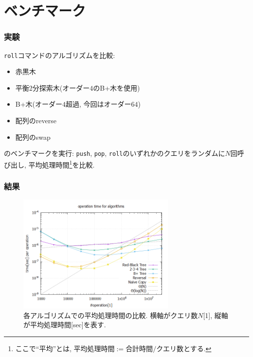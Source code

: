 \documentclass[10pt]{beamer}
\begin{document}
\section{ベンチマーク}
\begin{frame}
    \frametitle{実験}

    \texttt{roll}コマンドのアルゴリズムを比較:
    \begin{itemize}
        \item 赤黒木
        \item 平衡2分探索木(オーダー$4$のB+木を使用)
        \item B+木(オーダー$4$超過, 今回はオーダー$64$)
        \item 配列のreverse
        \item 配列のswap
    \end{itemize}

    \cite{primenumber:2022}のベンチマークを実行:
    \texttt{push}, \texttt{pop}, \texttt{roll}のいずれかのクエリをランダムに$N$回呼び出し,
    平均処理時間\footnote{ここで``平均''とは,
        $\textrm{平均処理時間}:=\textrm{合計時間}/\textrm{クエリ数}$とする.}を比較.

\end{frame}
\begin{frame}
    \frametitle{結果}

    \begin{figure}
        \centering
        \includegraphics[width=0.7\textwidth]{algorithm.png}
        \caption{各アルゴリズムでの平均処理時間の比較.
        横軸がクエリ数$N$[1], 縦軸が平均処理時間[sec]を表す.}
    \end{figure}
\end{frame}
\end{document}
